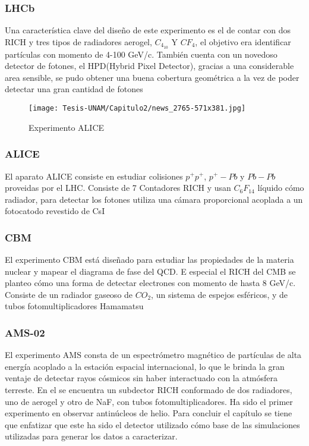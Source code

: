 \subsubsection{LHCb} Una característica clave del diseño de este experimento es el de contar con dos RICH y tres tipos de radiadores aerogel, $C_4_{10}$ Y $CF_4$, el objetivo era identificar partículas con momento de 4-100 GeV/c. También cuenta con un novedoso detector de fotones, el HPD(Hybrid Pixel Detector), gracias a una considerable area sensible, se pudo obtener una buena cobertura geométrica a la vez de poder detectar una gran cantidad de fotones \cite{PAPANESTIS2020162004}

\pagebreak

\begin{figure}[h!]
    \centering
    \texttt{[image: Tesis-UNAM/Capitulo2/news\_2765-571x381.jpg]}
    \caption{Experimento ALICE}
    \label{fig:enter-label}
\end{figure}

\subsubsection{ALICE} El aparato ALICE consiste en estudiar colisiones $p^+p^+$, $p^+-Pb$ y $Pb-Pb$ proveidas por el LHC. Consiste de 7 Contadores RICH y usan $C_6F_{14}$ líquido cómo radiador, para detectar los fotones utiliza una cámara proporcional acoplada a un fotocatodo revestido de CsI \cite{VOLPE2014259}

\subsubsection{CBM} El experimento CBM está diseñado para estudiar las propiedades de la materia nuclear y mapear el diagrama de fase del QCD. E especial el RICH del CMB se planteo cómo una forma de detectar electrones con momento de hasta 8 GeV/c. Consiste de un radiador gaseoso de $CO_2$, un sistema de espejos esféricos, y de tubos fotomultiplicadores Hamamatsu \cite{ADAMCZEWSKIMUSCH201765}

\pagebreak

\subsubsection{AMS-02} 


El experimento AMS consta de un espectrómetro magnético de partículas de alta energía acoplado a la estación espacial internacional, lo que le brinda la gran ventaje de detectar rayos cósmicos sin haber interactuado con la atmósfera terreste. En el se encuentra un subdector RICH conformado de dos radiadores, uno de aerogel y otro de NaF, con tubos fotomultiplicadores. Ha sido el primer experimento en observar antinúcleos de helio. Para concluir el capítulo se tiene que enfatizar que este ha sido el detector utilizado cómo base de las simulaciones utilizadas para generar los datos a caracterizar.\cite{LIU20175}